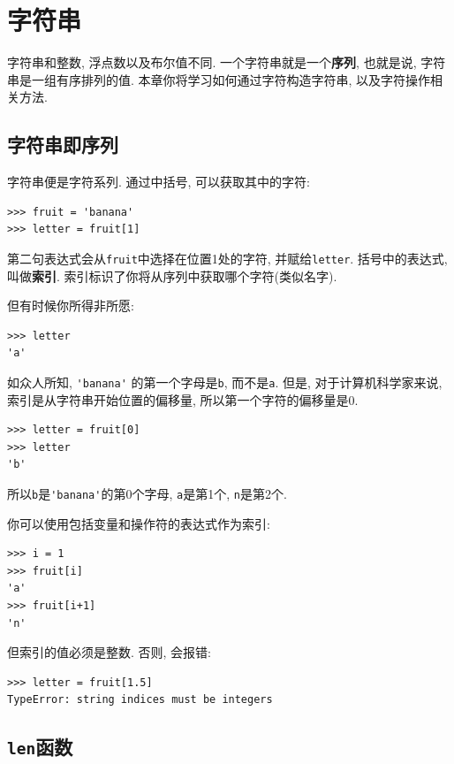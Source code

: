 \documentclass[10pt]{book}
\begin{document}
\chapter{字符串}
\label{strings}

字符串和整数, 浮点数以及布尔值不同. 
一个字符串就是一个{\bf 序列}, 也就是说, 字符串是一组有序排列的值. 
本章你将学习如何通过字符构造字符串, 以及字符操作相关方法. 


\section{字符串即序列}

字符串便是字符系列. 
通过中括号, 可以获取其中的字符:

\begin{verbatim}
>>> fruit = 'banana'
>>> letter = fruit[1]
\end{verbatim}
%
第二句表达式会从{\tt fruit}中选择在位置1处的字符, 并赋给{\tt letter}. 
括号中的表达式, 叫做{\bf 索引}.
索引标识了你将从序列中获取哪个字符(类似名字).

但有时候你所得非所愿:

\begin{verbatim}
>>> letter
'a'
\end{verbatim}
%
如众人所知,  \verb"'banana'" 的第一个字母是{\tt b}, 
而不是{\tt a}. 但是, 对于计算机科学家来说, 索引是从字符串开始位置的偏移量, 
所以第一个字符的偏移量是0.

\begin{verbatim}
>>> letter = fruit[0]
>>> letter
'b'
\end{verbatim}
%
所以{\tt b}是\verb"'banana'"的第0个字母,  {\tt a}是第1个, {\tt n}是第2个. 
 

你可以使用包括变量和操作符的表达式作为索引:

\begin{verbatim}
>>> i = 1
>>> fruit[i]
'a'
>>> fruit[i+1]
'n'
\end{verbatim}
%
但索引的值必须是整数. 否则, 会报错:

\begin{verbatim}
>>> letter = fruit[1.5]
TypeError: string indices must be integers
\end{verbatim}
%

\section{{\tt len}函数}
\end{document}
